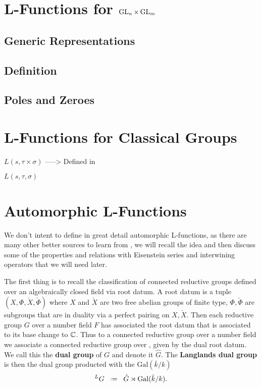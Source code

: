 
\section{L-Functions for \(\operatorname{GL}_n\times \operatorname{GL}_m\)}
\subsection{Generic Representations}

\subsection{Definition}
\cite{cogdellLECTURESINTEGRALREPRESENTATIONS}

\subsection{Poles and Zeroes}


\section{L-Functions for Classical Groups}

\(L(s, \tau\times \sigma)\)
\cite{remarks on rankin selberg convolutions Cogdel and PT-shapiro}\cite{cogdellFunctorialityClassicalGroups2004} -----> Defined in \cite{shahidiProofLanglandsConjecture1990}

\(L(s, \tau, \sigma)\)
\cite{grbacResidualSpectrumSplit2011}

\section{Automorphic L-Functions}
We don't intent to define in great detail automorphic L-functions, as there are many other better sources to learn from \cite[Part 2.III.2]{borelAutomorphicFormsRepresentations1979}\cite{shahidiEisensteinSeriesAutomorphic2010}\cite{cogdellLFUNCTIONSFUNCTORIALITY}\cite[9, 10, 11]{bumpIntroductionLanglandsProgram2004}\cite{arthurLfunctionsAutomorphicRepresenta}, we will recall the idea and then discuss some of the properties and relations with Eisenstein series and interwining operators that we will need later.

The first thing is to recall the classification of connected reductive groups defined over an algebraically closed field via root datum. A root datum is a tuple \((X, \Phi, \check{X} , \check{\Phi})\) where \(X\) and \(\check{X}\) are two free abelian groups of finite type, \(\Phi, \check{\Phi}\) are subgroups that are in duality via a perfect pairing on \(X, \check{X}\). Then each reductive group \(G\) over a number field \(F\) has associated the root datum that is associated to its base change to \(\C\). Thus to a connected reductive group over a number field we associate a connected reductive group over \C, given by the dual root datum. We call this the \textbf{dual group} of \(G\) and denote it \(\hat{G}\). The \textbf{Langlands dual group} is then the dual group producted with the \(\mathrm{Gal}(\bar{k}/k)\)
\[^L G \defeq \hat{G} \rtimes \mathrm{Gal}(\bar{k}/k).\]

